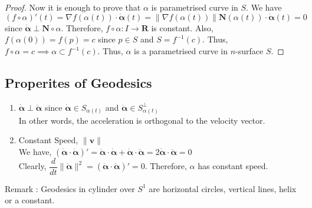 \begin{proof}
	Now it is enough to prove that $\alpha$ is parametrised curve in $S$. We have $(f \circ \alpha)'(t) = \nabla f(\alpha(t)) \cdot \dot{\boldsymbol{\alpha}}(t) = \| \nabla f(\alpha(t)) \| \mathbf{N}(\alpha(t)) \cdot \dot{\boldsymbol{\alpha}}(t) = 0$ since $\dot{\boldsymbol{\alpha}} \perp \mathbf{N} \circ \alpha$. Therefore, $f \circ \alpha : I \to \mathbf{R}$ is constant. Also, $f(\alpha(0)) = f(p) = c$ since $p \in S$ and $S = f^{-1}(c)$. Thus, $f \circ \alpha = c \implies \alpha \subset f^{-1}(c)$. Thus, $\alpha$ is a parametrised curve in $n$-surface $S$.
\end{proof}

\subsection{Properites of Geodesics}
\begin{enumerate}
	\item $\dot{\boldsymbol{\alpha}} \perp \ddot{\boldsymbol{\alpha}}$ since $\dot{\boldsymbol{\alpha}} \in S_{\alpha(t)}$ and $\ddot{\boldsymbol{\alpha}} \in S_{\alpha(t)}^\perp$\\
		In other words, the acceleration is orthogonal to the velocity vector.
	\item Constant Speed, $\| \mathbf{v} \|$\\
		We have, $(\dot{\boldsymbol{\alpha}} \cdot \dot{\boldsymbol{\alpha}})' =  \ddot{\boldsymbol{\alpha}} \cdot \dot{\boldsymbol{\alpha}} + \dot{\boldsymbol{\alpha}} \cdot \ddot{\boldsymbol{\alpha}} = 2\dot{\boldsymbol{\alpha}} \cdot \ddot{\boldsymbol{\alpha}} = 0$\\
		Clearly, $\dfrac{d}{dt} \|\dot{\boldsymbol{\alpha}} \|^2 =  \left( \dot{\boldsymbol{\alpha}} \cdot \dot{\boldsymbol{\alpha}} \right)' = 0$. Therefore, $\alpha$ has constant speed. \\

\end{enumerate} 

Remark :  Geodesics in cylinder over $S^1$ are horizontal circles, vertical lines, helix or a constant. 

